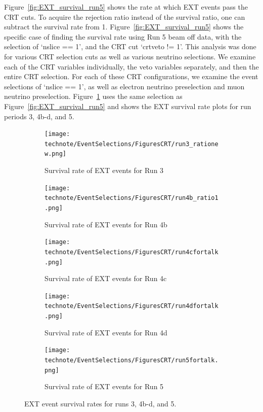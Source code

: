 Figure~\ref{fig:EXT_survival_run5} shows the rate at which EXT events pass the CRT cuts. To acquire the rejection ratio instead of the survival ratio, one can subtract the survival rate from 1. Figure~\ref{fig:EXT_survival_run5} shows the specific case of finding the survival rate using Run 5 beam off data, with the selection of `nslice == 1', and the CRT cut `crtveto != 1'. 
This analysis was done for various CRT selection cuts as well as various neutrino selections. We examine each of the CRT variables individually, the veto variables separately, and then the entire CRT selection. For each of these CRT configurations, we examine the event selections of `nslice == 1', as well as electron neutrino preselection and muon neutrino preselection. 
Figure~\ref{fig:EXT_survival_allruns} uses the same selection as Figure~\ref{fig:EXT_survival_run5} and shows the EXT survival rate plots for run periods 3, 4b-d, and 5.

\begin{figure}[H]
 \centering
    \begin{subfigure}[t]{0.3\linewidth}
        \texttt{[image: technote/EventSelections/FiguresCRT/run3\_rationew.png]}
        \caption{Survival rate of EXT events for Run 3}
    \end{subfigure}%
    \hspace{0.3cm}%
    \begin{subfigure}[t]{0.3\linewidth}
        \texttt{[image: technote/EventSelections/FiguresCRT/run4b\_ratio1.png]}%
        \caption{Survival rate of EXT events for Run 4b}
    \end{subfigure}%
    \hspace{0.3cm}%
    \begin{subfigure}[t]{0.3\linewidth}
        \texttt{[image: technote/EventSelections/FiguresCRT/run4cfortalk.png]}%
        \caption{Survival rate of EXT events for Run 4c}
    \end{subfigure}
    \hspace{0.3cm}%
    \begin{subfigure}[t]{0.3\linewidth}
        \texttt{[image: technote/EventSelections/FiguresCRT/run4dfortalk.png]}%
        \caption{Survival rate of EXT events for Run 4d}
    \end{subfigure}
    \hspace{0.3cm}%
    \begin{subfigure}[t]{0.3\linewidth}
        \texttt{[image: technote/EventSelections/FiguresCRT/run5fortalk.png]}%
        \caption{Survival rate of EXT events for Run 5}
    \end{subfigure}
    \caption{EXT event survival rates for runs 3, 4b-d, and 5. }
    \label{fig:EXT_survival_allruns}
\end{figure}

